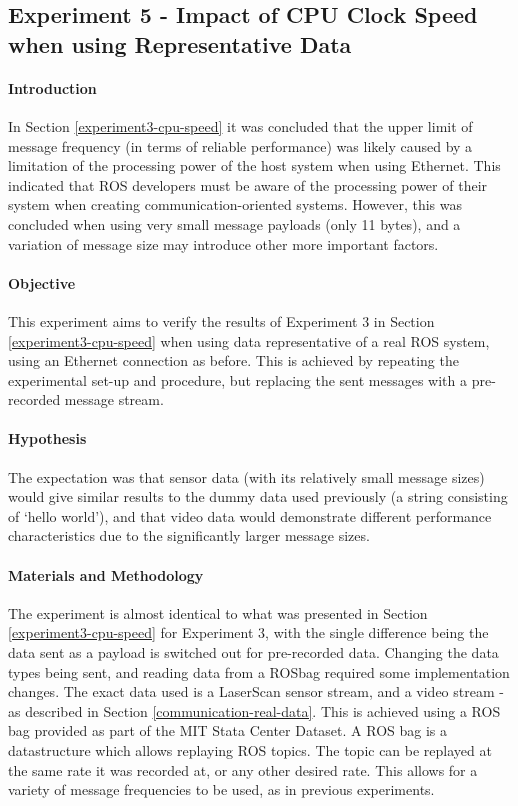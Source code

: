 \documentclass[../dissertation.tex]{subfiles}
\begin{document}
\subsection{Experiment 5 - Impact of CPU Clock Speed when using Representative Data}
\label{exp-5}

\paragraph{Introduction} In Section \ref{experiment3-cpu-speed} it was concluded that the upper limit of message frequency (in terms of reliable performance) was likely caused by a limitation of the processing power of the host system when using Ethernet. This indicated that ROS developers must be aware of the processing power of their system when creating communication-oriented systems. However, this was concluded when using very small message payloads (only 11 bytes), and a variation of message size may introduce other more important factors.

\paragraph{Objective} This experiment aims to verify the results of Experiment 3 in Section \ref{experiment3-cpu-speed} when using data representative of a real ROS system, using an Ethernet connection as before. This is achieved by repeating the experimental set-up and procedure, but replacing the sent messages with a pre-recorded message stream.

\paragraph{Hypothesis} The expectation was that sensor data (with its relatively small message sizes) would give similar results to the dummy data used previously (a string consisting of `hello world'), and that video data would demonstrate different performance characteristics due to the significantly larger message sizes.

\paragraph{Materials and Methodology} The experiment is almost identical to what was presented in Section \ref{experiment3-cpu-speed} for Experiment 3, with the single difference being the data sent as a payload is switched out for pre-recorded data. Changing the data types being sent, and reading data from a ROSbag required some implementation changes\cite{Experiment5ROSbagCode}. The exact data used is a LaserScan sensor stream, and a video stream - as described in Section \ref{communication-real-data}. This is achieved using a ROS bag provided as part of the MIT Stata Center Dataset. A ROS bag is a datastructure which allows replaying ROS topics. The topic can be replayed at the same rate it was recorded at, or any other desired rate. This allows for a variety of message frequencies to be used, as in previous experiments.
\end{document}
